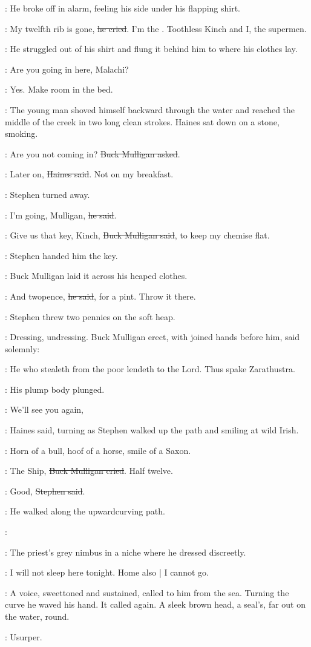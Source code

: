 :
He broke off in alarm,
feeling his side under his flapping shirt.

\Mulligan:
My twelfth rib is gone,
\sout{he cried}.
I'm the .
Toothless Kinch and I, the supermen.

:
He struggled out of his shirt
and flung it behind him to where his clothes lay.

\YoungMan:
Are you going in here, Malachi?

\Mulligan:
Yes. Make room in the bed.

:
The young man shoved himself backward through the water
and reached the middle of the creek in two long clean strokes.
Haines sat down on a stone, smoking.

\Mulligan:
Are you not coming in?
\sout{Buck Mulligan asked}.

\Haines:
Later on,
\sout{Haines said}.
Not on my breakfast.

:
Stephen turned away.

\Stephen:
I'm going, Mulligan,
\sout{he said}.

\Mulligan:
Give us that key, Kinch,
\sout{Buck Mulligan said},
to keep my chemise flat.

:
Stephen handed him the key.

:
Buck Mulligan laid it across his heaped clothes.

\Mulligan:
And twopence,
\sout{he said},
for a pint.
Throw it there.

:
Stephen threw two pennies on the soft heap.

:
Dressing, undressing.
Buck Mulligan erect,
with joined hands before him,
said solemnly:

\Mulligan:
He who stealeth from the poor lendeth to the Lord.
Thus spake Zarathustra.

:
His plump body plunged.

\Haines:
We'll see you again,

:
Haines said,
turning as Stephen walked up the path and smiling at wild Irish.

\StephenInt:
Horn of a bull,
hoof of a horse,
smile of a Saxon.

\Mulligan:
The Ship,
\sout{Buck Mulligan cried}.
Half twelve.

\Stephen:
Good,
\sout{Stephen said}.

:
He walked along the upwardcurving path.

\StephenInt:
\begin{verse}
\end{verse}

:
The priest's grey nimbus in a niche where he dressed discreetly.

\StephenInt:
I will not sleep here tonight.
Home also |
I cannot go.

:
A voice, sweettoned and sustained,
called to him from the sea.
Turning the curve he waved his hand.
It called again.
A sleek brown head, a seal's,
far out on the water, round.

\StephenInt:
Usurper.
